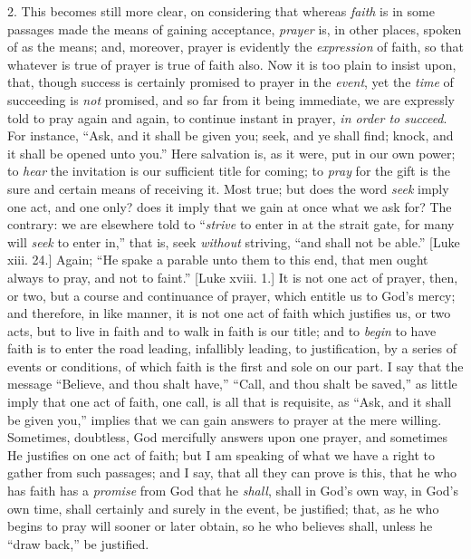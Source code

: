 2. This becomes still more clear, on considering that whereas \emph{faith}
is in some passages made the means of gaining acceptance, \emph{prayer}
is, in other places, spoken of as the means; and, moreover, prayer is
evidently the \emph{expression} of faith, so that whatever is true of
prayer is true of faith also. Now it is too plain to insist upon,
that, though success is certainly promised to prayer in the \emph{event},
yet the \emph{time} of succeeding is \emph{not} promised, and so far
from it being immediate, we are expressly told to pray again and
again, to continue instant in prayer, \emph{in order to succeed}. For
instance, ``Ask, and it shall be given you; seek, and ye shall
find; knock, and it shall be opened unto you.'' Here salvation is,
as it were, put in our own power; to \emph{hear} the invitation is our
sufficient title for coming; to \emph{pray} for the gift is the sure
and certain means of receiving it. Most true; but does the word \emph{seek}
imply one act, and one only? does it imply that we gain at once what
we ask for? The contrary: we are elsewhere told to ``\emph{strive}
to enter in at the strait gate, for many will \emph{seek} to enter
in,'' that is, seek \emph{without} striving, ``and shall not
be able.'' [Luke xiii. 24.] Again; ``He spake a parable unto
them to this end, that men ought always to pray, and not to
faint.'' [Luke xviii. 1.] It is not one act of prayer, then, or
two, but a course and continuance of prayer, which entitle us to God's
mercy; and therefore, in like manner, it is not one act of faith which
justifies us, or two acts, but to live in faith and to walk in faith
is our title; and to \emph{begin} to have faith is to enter the road
leading, infallibly leading, to justification, by a series of events
or conditions, of which faith is the first and sole on our part. I say
that the message ``Believe, and thou shalt have,'' ``Call,
and thou shalt be saved,'' as little imply that one act of faith,
one call, is all that is requisite, as ``Ask, and it shall be
given you,'' implies that we can gain answers to prayer at the
mere willing. Sometimes, doubtless, God mercifully answers upon one
prayer, and sometimes He justifies on one act of faith; but I am
speaking of what we have a right to gather from such passages; and I
say, that all they can prove is this, that he who has faith has a \emph{promise}
from God that he \emph{shall}, shall in God's own way, in God's own
time, shall certainly and surely in the event, be justified; that, as
he who begins to pray will sooner or later obtain, so he who believes
shall, unless he ``draw back,'' be justified.

